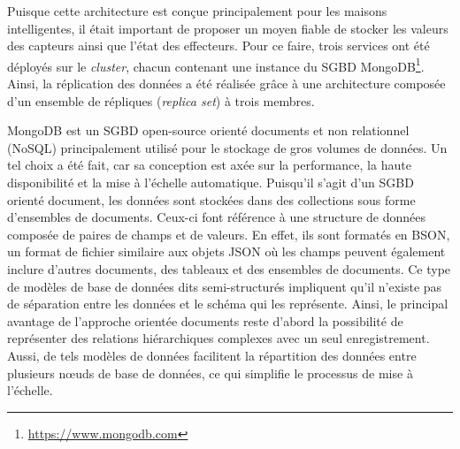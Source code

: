 Puisque cette architecture est conçue principalement pour les maisons intelligentes, il était important de proposer un moyen fiable de stocker les valeurs des capteurs ainsi que l'état des effecteurs. Pour ce faire, trois services ont été déployés sur le \textit{cluster}, chacun contenant une instance du \ac{SGBD} MongoDB\footnote{\url{https://www.mongodb.com}}. Ainsi, la réplication des données a été réalisée grâce à une architecture composée d'un ensemble de répliques (\textit{replica set}) à trois membres.

MongoDB est un \acs{SGBD} open-source orienté documents et non relationnel (\acs{NoSQL}) principalement utilisé pour le stockage de gros volumes de données. Un tel choix a été fait, car sa conception est axée sur la performance, la haute disponibilité et la mise à l'échelle automatique. Puisqu'il s'agit d'un \acs{SGBD} orienté document, les données sont stockées dans des collections sous forme d'ensembles de documents. Ceux-ci font référence à une structure de données composée de paires de champs et de valeurs. En effet, ils sont formatés en \ac{BSON}, un format de fichier similaire aux objets \acs{JSON} où les champs peuvent également inclure d'autres documents, des tableaux et des ensembles de documents. Ce type de modèles de base de données dits semi-structurés impliquent qu'il n'existe pas de séparation entre les données et le schéma qui les représente. Ainsi, le principal avantage de l'approche orientée documents reste d'abord la possibilité de représenter des relations hiérarchiques complexes avec un seul enregistrement. Aussi, de tels modèles de données facilitent la répartition des données entre plusieurs n\oe{}uds de base de données, ce qui simplifie le processus de mise à l'échelle.

